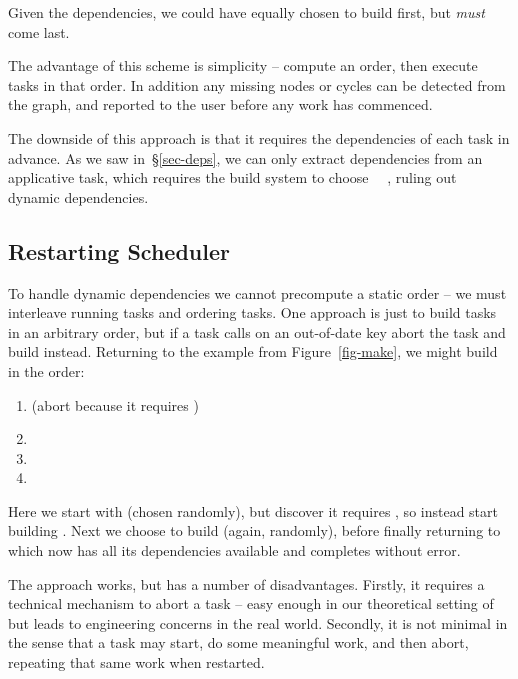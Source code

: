 Given the dependencies, we could have equally chosen to build  first, but  \emph{must}
come last.

The advantage of this scheme is simplicity -- compute an order, then execute tasks in that order.
In addition any missing nodes or cycles can be detected from the graph, and reported to the user
before any work has commenced.

The downside of this approach is that it requires the dependencies of each task in advance.
As we saw in~\S\ref{sec-deps}, we can only extract dependencies from an applicative task, which requires the
build system to choose ~\hs{=}~, ruling out dynamic dependencies.

\subsection{Restarting Scheduler}\label{sec-restarting}

To handle dynamic dependencies we cannot precompute a static order -- we must
interleave running tasks and ordering tasks. One approach is just to build tasks
in an arbitrary order, but if a task calls  on an out-of-date key 
abort the task and build  instead. Returning to the example from
Figure~\ref{fig-make}, we might build in the order:

\begin{enumerate}
\item {} (abort because it requires )
\item {}
\item {}
\item {}
\end{enumerate}

Here we start with  (chosen randomly), but discover it requires , so
instead start building . Next we choose to build  (again, randomly),
before finally returning to  which now has all its dependencies available and
completes without error.

The approach works, but has a number of disadvantages. Firstly, it requires a technical mechanism
to abort a task -- easy enough in our theoretical setting of  but leads to engineering concerns
in the real world. Secondly, it is not minimal in the sense that a task may
start, do some meaningful work, and then abort, repeating that same work when restarted.

